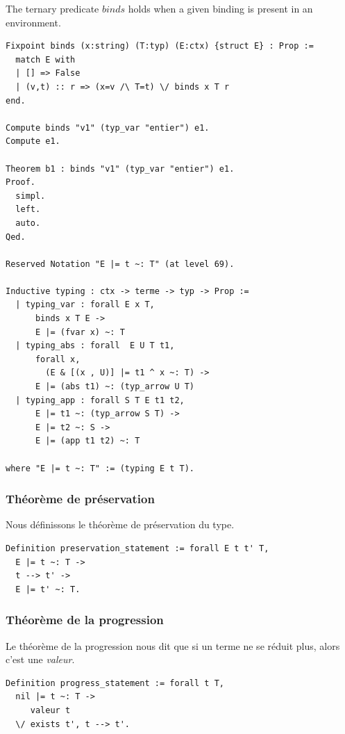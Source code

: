 \documentclass[11pt]{book}
\begin{document}
The ternary predicate $binds$ holds when a given binding is
    present in an environment.  

\begin{Verbatim}
Fixpoint binds (x:string) (T:typ) (E:ctx) {struct E} : Prop :=
  match E with
  | [] => False
  | (v,t) :: r => (x=v /\ T=t) \/ binds x T r
end.

Compute binds "v1" (typ_var "entier") e1.
Compute e1.

Theorem b1 : binds "v1" (typ_var "entier") e1.
Proof.
  simpl.
  left.
  auto.
Qed.

Reserved Notation "E |= t ~: T" (at level 69).

Inductive typing : ctx -> terme -> typ -> Prop :=
  | typing_var : forall E x T,
      binds x T E ->
      E |= (fvar x) ~: T
  | typing_abs : forall  E U T t1,
      forall x,  
        (E & [(x , U)] |= t1 ^ x ~: T) ->
      E |= (abs t1) ~: (typ_arrow U T)
  | typing_app : forall S T E t1 t2,
      E |= t1 ~: (typ_arrow S T) -> 
      E |= t2 ~: S ->
      E |= (app t1 t2) ~: T

where "E |= t ~: T" := (typing E t T).
\end{Verbatim}

\subsubsection{Théorème de préservation}
Nous définissons le théorème de préservation du type.
\begin{Verbatim}
Definition preservation_statement := forall E t t' T,
  E |= t ~: T ->
  t --> t' ->
  E |= t' ~: T.
\end{Verbatim}

\subsubsection{Théorème de la progression}
Le théorème de la progression nous dit que si un terme ne se réduit plus, alors c'est une \textit{valeur}.
\begin{Verbatim}
Definition progress_statement := forall t T, 
  nil |= t ~: T ->
     valeur t 
  \/ exists t', t --> t'.
\end{Verbatim}
\end{document}
